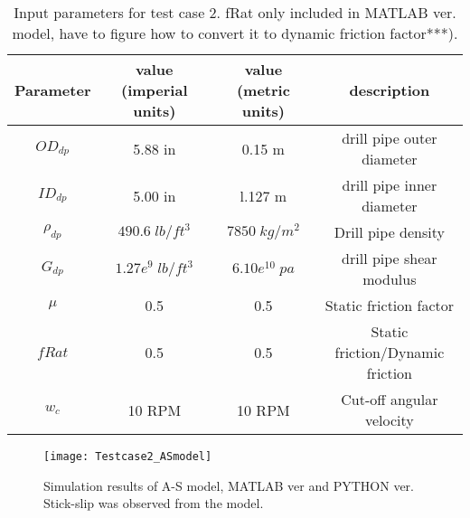  \begin{table}[!hbt]
\centering
\begin{tabular}{|c|c|c|c|}
\hline
Parameter & value (imperial units) & value (metric units) & description\\                                                              
\hline
$OD_{dp}$ & 5.88 in & 0.15 m & drill pipe outer diameter\\                                                       
\hline
$ID_{dp}$ & 5.00 in & l.127 m & drill pipe inner diameter  \\                                                      
\hline
$\rho_{dp}$ & $490.6\;lb/ft^3$ & $7850\;kg/m^2$ & Drill pipe density \\                                                  
\hline
$G_{dp}$ & $1.27e^{9}\;lb/ft^3$ & $6.10e^{10}\;pa$ & drill pipe shear modulus\\                                                              
\hline
$\mu$ & 0.5 & 0.5 & Static friction factor\\
\hline
$fRat$ & 0.5 & 0.5 & Static friction/Dynamic friction\\
\hline
$w_c$ & 10 RPM & 10 RPM & Cut-off angular velocity\\
\hline
\end{tabular}
\caption[Input parameters for test case 2.]{Input parameters for test case 2. fRat only included in MATLAB ver. model, have to figure how to convert it to dynamic friction factor***).}\label{table_Inclinedwell_input}
\end{table}

\begin{figure}[!hbt]
  \centering
  \texttt{[image: Testcase2\_ASmodel]}
  \caption[Result from A-S model. (test case 2)]{Simulation results of A-S model, MATLAB ver and PYTHON ver. Stick-slip was observed from the model.}\label{figure_testcase2_ASmodel}
\end{figure}
